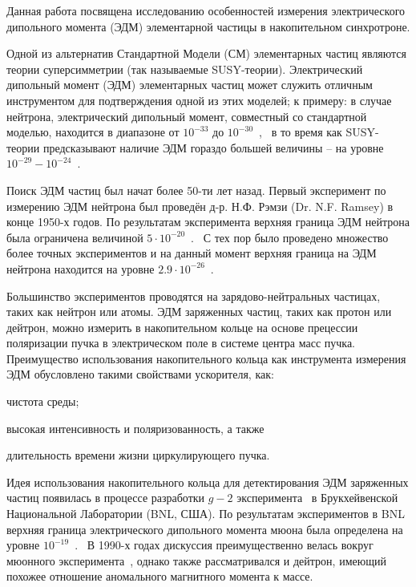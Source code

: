 
{\actuality} 
Данная работа посвящена исследованию особенностей измерения электрического дипольного момента (ЭДМ) 
элементарной частицы в накопительном синхротроне.

Одной из альтернатив Стандартной Модели (СМ) элементарных частиц являются теории суперсимметрии 
(так называемые  SUSY-теории). Электрический дипольный момент (ЭДМ) элементарных частиц может служить
отличным инструментом для подтверждения одной из этих моделей; к примеру: в случае нейтрона, 
электрический дипольный момент, совместный со стандартной моделью, 
находится в диапазоне от $10^{-33}$ до $10^{-30}$~\ecm,~\cite{Harris:Neutron2007} 
в то время как SUSY-теории предсказывают наличие ЭДМ гораздо большей величины -- 
на уровне ${10^{-29} - 10^{-24}}$~\ecm. 

Поиск ЭДМ частиц был начат более 50-ти лет назад. Первый эксперимент по измерению ЭДМ нейтрона был проведён д-р. Н.Ф. Рэмзи (Dr. N.F. Ramsey) в конце 1950-х годов. По результатам эксперимента верхняя граница ЭДМ нейтрона была ограничена величиной ${5\cdot 10^{-20}}$~\ecm.~\cite{Ramsey:Neutron1957} 
С тех пор было проведено множество более точных экспериментов 
и на данный момент верхняя граница на ЭДМ нейтрона находится на уровне 
${2.9\cdot10^{-26}}$~\ecm.~\cite{Baker:nEDM:Main, Baker:nEDM:Reply}

Большинство экспериментов проводятся на зарядово-нейтральных частицах, таких как нейтрон или атомы. 
ЭДМ заряженных частиц, таких как протон или дейтрон, можно измерить в накопительном кольце 
на основе прецессии поляризации пучка в электрическом поле в системе центра масс пучка. 
Преимущество использования накопительного кольца как инструмента измерения ЭДМ 
обусловлено такими свойствами ускорителя, как:
\begin{enumerate*}[(1)]
	\item чистота среды;
	\item высокая интенсивность и поляризованность, а также
	\item длительность времени жизни циркулирующего пучка.~\cite[стр.~9]{BNL:Deuteron2008}
\end{enumerate*}

Идея использования накопительного кольца для детектирования ЭДМ заряженных частиц 
появилась в процессе разработки $g-2$ эксперимента~\cite{BNL:g-2:2001} 
в Брукхейвенской Национальной Лаборатории (BNL, США). По результатам экспериментов в BNL 
верхняя граница электрического дипольного момента мюона была определена 
на уровне $10^{-19}$~\ecm.~\cite{BNL:muon_ANA:2009} В 1990-х годах дискуссия преимущественно велась 
вокруг мюонного эксперимента~\cite{Farley:SREDM:Muon}, однако также рассматривался и дейтрон, 
имеющий похожее отношение аномального магнитного момента к массе.

